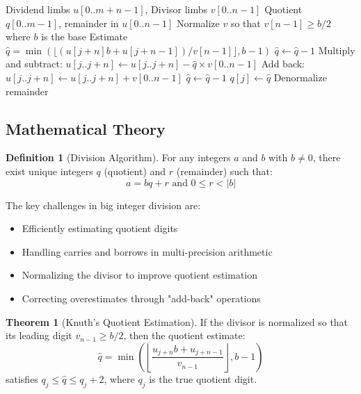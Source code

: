 \documentclass[12pt,a4paper]{article}
\theoremstyle{definition}
\newtheorem{definition}{Definition}[section]
\newtheorem{theorem}{Theorem}[section]
\begin{document}
\begin{algorithm}[H]
\caption{Multi-limb Division}
\label{alg:multi-limb-division}
\begin{algorithmic}[1]
\REQUIRE Dividend limbs $u[0..m+n-1]$, Divisor limbs $v[0..n-1]$
\ENSURE Quotient $q[0..m-1]$, remainder in $u[0..n-1]$
\STATE Normalize $v$ so that $v[n-1] \geq b/2$ where $b$ is the base
    \STATE Estimate $\hat{q} = \min\left(\lfloor(u[j+n]b + u[j+n-1])/v[n-1]\rfloor, b-1\right)$
        \STATE $\hat{q} \leftarrow \hat{q} - 1$
    \ENDWHILE
    \STATE Multiply and subtract: $u[j..j+n] \leftarrow u[j..j+n] - \hat{q} \times v[0..n-1]$
        \STATE Add back: $u[j..j+n] \leftarrow u[j..j+n] + v[0..n-1]$
        \STATE $\hat{q} \leftarrow \hat{q} - 1$
    \ENDIF
    \STATE $q[j] \leftarrow \hat{q}$
\ENDFOR
\STATE Denormalize remainder
\end{algorithmic}
\end{algorithm}

\subsection{Mathematical Theory}

\begin{definition}[Division Algorithm]
For any integers $a$ and $b$ with $b \neq 0$, there exist unique integers $q$ (quotient) and $r$ (remainder) such that:
\[a = bq + r \text{ and } 0 \leq r < |b|\]
\end{definition}

The key challenges in big integer division are:
\begin{itemize}
    \item Efficiently estimating quotient digits
    \item Handling carries and borrows in multi-precision arithmetic
    \item Normalizing the divisor to improve quotient estimation
    \item Correcting overestimates through "add-back" operations
\end{itemize}

\begin{theorem}[Knuth's Quotient Estimation]
If the divisor is normalized so that its leading digit $v_{n-1} \geq b/2$, then the quotient estimate:
\[\hat{q} = \min\left(\left\lfloor\frac{u_{j+n}b + u_{j+n-1}}{v_{n-1}}\right\rfloor, b-1\right)\]
satisfies $q_j \leq \hat{q} \leq q_j + 2$, where $q_j$ is the true quotient digit.
\end{theorem}
\end{document}
